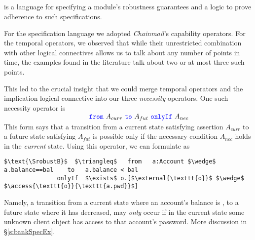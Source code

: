 \vspace{.04in}

\subsection{\Nec}
\label{intro:this:work}
\Nec is a language for specifying a module's robustness guarantees 
and a logic 
to prove adherence to such specifications.

For the specification language we adopted  
\emph{Chainmail}'s    capability operators.
{For the 
  temporal operators, we observed that while their
   unrestricted combination with  other logical connectives allows us to talk about any
   number of points in time, the examples found in the literature talk about two or at most three such points. }

  
  {This led to the  crucial insight that we could merge  temporal operators and the implication 
 logical connective into our three}
   \emph{necessity} operators. 
 One such necessity operator is \\
$ 
\strut \hspace{1.7in} {\color{blue}\texttt{from}}\ A_{curr}\ {\color{blue}\texttt{to}}\ A_{fut}\ {\color{blue}\texttt{onlyIf}}\ A_{nec}
$  
\\
This form says that  
a  {transition} from a current state satisfying assertion $A_{curr}$ to a future
state satisfying $A_{fut}$  is possible only if  the   necessary 
condition
$A_{nec}$ holds in the \emph{current} state.
Using this operator, we can formulate  \SrobustB  
as
\begin{lstlisting}[language = Chainmail, mathescape=true, frame=lines]
   $\text{\SrobustB}$  $\triangleq$   from   a:Account $\wedge$ a.balance==bal    to   a.balance < bal
               onlyIf  $\exists$ o.[$\external{\texttt{o}}$ $\wedge$ $\access{\texttt{o}}{\texttt{a.pwd}}$]
\end{lstlisting}
Namely, a transition from a  {current} state where an account's balance is , to a  {future} state where 
it has decreased, may \emph{only} occur if  {in the current state} some unknown client object  
has access to that account's password. 
More discussion in \S\ref{s:bankSpecEx}. 


